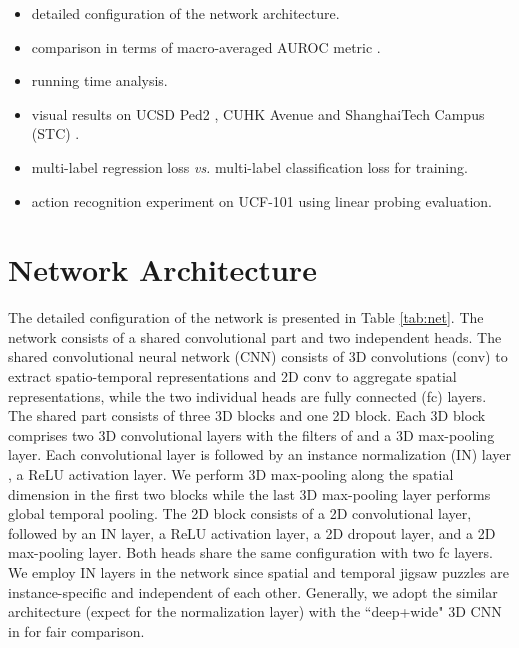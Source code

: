 \documentclass[runningheads]{llncs}
\begin{document}
\begin{itemize}
	\item detailed configuration of the network architecture.
	
	\item comparison in terms of macro-averaged AUROC metric \cite{georgescu2020background}.
	
	\item running time analysis.
	
	\item visual results on UCSD Ped2 \cite{mahadevan2010anomaly}, CUHK Avenue \cite{lu2013abnormal} and ShanghaiTech Campus (STC) \cite{luo2017revisit}.
	
	\item multi-label regression loss \emph{vs.} multi-label classification loss for training.
	
	\item action recognition experiment on UCF-101 \cite{soomro2012ucf101} using linear probing evaluation.
	
\end{itemize}


\section{Network Architecture}

The detailed configuration of the network is presented in Table \ref{tab:net}. The network consists of a shared convolutional part and two independent heads. The shared convolutional neural network (CNN) consists of 3D convolutions (conv) to extract spatio-temporal representations and 2D conv to aggregate spatial representations, while the two individual heads are fully connected (fc) layers. The shared part consists of three 3D blocks and one 2D block. Each 3D block comprises two 3D convolutional layers with the filters of  and  a 3D max-pooling layer. Each convolutional layer is followed by an instance normalization (IN) layer \cite{ulyanov2016instance}, a ReLU activation layer. We perform 3D max-pooling along the spatial dimension in the first two blocks while the last 3D max-pooling layer performs global temporal pooling. The 2D block consists of a 2D convolutional layer, followed by an IN layer, a ReLU activation layer, a 2D dropout layer, and a 2D max-pooling layer. Both heads share the same configuration with two fc layers. We employ IN layers in the network since spatial and temporal jigsaw puzzles are instance-specific and independent of each other. Generally, we adopt the similar architecture (expect for the normalization layer) with the ``deep+wide" 3D CNN in \cite{georgescu2021anomaly} for fair comparison. 
\end{document}

